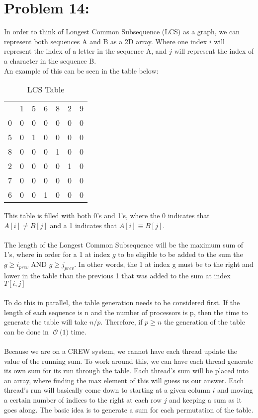 \documentclass[12pt]{article}
\newcommand{\BigO}[1]{\ensuremath{\operatorname{\mathcal{O}}\bigl(#1\bigr)}}
\begin{document}
\section*{Problem 14: }
In order to think of Longest Common Subsequence (LCS) as a graph, we can represent both sequences A and B as a 2D array. Where one index {$i$} will represent the index of a letter in the sequence A, and {$j$} will represent the index of a character in the sequence B.\\
An example of this can be seen in the table below:
\begin{table}[H]
\centering
\caption{LCS Table}
\label{my-label}
\begin{tabular}{ccccccc}
                       & 1 & 5 & 6 & 8 & 2 & 9 \\ \cline{2-7} 
\multicolumn{1}{c|}{0} & 0 & 0 & 0 & 0 & 0 & 0 \\
\multicolumn{1}{c|}{5} & 0 & 1 & 0 & 0 & 0 & 0 \\
\multicolumn{1}{c|}{8} & 0 & 0 & 0 & 1 & 0 & 0 \\
\multicolumn{1}{c|}{2} & 0 & 0 & 0 & 0 & 1 & 0 \\
\multicolumn{1}{c|}{7} & 0 & 0 & 0 & 0 & 0 & 0 \\
\multicolumn{1}{c|}{6} & 0 & 0 & 1 & 0 & 0 & 0
\end{tabular}
\end{table}
This table is filled with both 0's and 1's, where the 0 indicates that {$A[i] \neq B[j]$} and a 1 indicates that {$A[i] \equiv B[j]$}.\\\\
The length of the Longest Common Subsequence will be the maximum sum of 1's, where in order for a 1 at index {$g$} to be eligible to be added to the sum the {$g \geq i_{prev}$ AND $g \geq j_{prev}$}. In other words, the 1 at index g must be to the right and lower in the table than the previous 1 that was added to the sum at index {$T[i,j]$}\\\\
To do this in parallel, the table generation needs to be considered first. If the length of each sequence is n and the number of processors is p, then the time to generate the table will take {$n/p$}. Therefore, if {$p \geq n$} the generation of the table can be done in \BigO 1 time.\\\\
Because we are on a CREW system, we cannot have each thread update the value of the running sum. To work around this, we can have each thread generate its own sum for its run through the table. Each thread's sum will be placed into an array, where finding the max element of this will guess us our answer. Each thread's run will basically come down to starting at a given column {$i$} and moving a certain number of indices to the right at each row {$j$} and keeping a sum as it goes along. The basic idea is to generate a sum for each permutation of the table.\\\\
\end{document}
